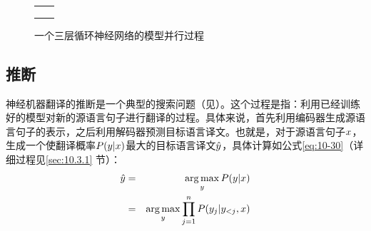 \begin{figure}[htp]
\centering
\begin{tabular}{l l}
\end{tabular}
\end{figure}
\begin{figure}[htp]
\centering
\begin{tabular}{l l}
\subfigure[]{} &\subfigure[]{} \\
\subfigure[]{}  &\subfigure[]{} \\
\subfigure[]{}  &\subfigure[]{}
\end{tabular}
\caption{一个三层循环神经网络的模型并行过程}
\label{fig:10-28}
\end{figure}

\subsection{推断}

\parinterval 神经机器翻译的推断是一个典型的搜索问题（见{\chaptertwo}）。这个过程是指：利用已经训练好的模型对新的源语言句子进行翻译的过程。具体来说，首先利用编码器生成源语言句子的表示，之后利用解码器预测目标语言译文。也就是，对于源语言句子${{x}}$，生成一个使翻译概率${P}({{y}} | {{x}})$最大的目标语言译文$\hat{{{y}}}$，具体计算如公式\eqref{eq:10-30}（详细过程见\ref{sec:10.3.1} 节）：
\begin{eqnarray}
\hat{{{y}}} & = & \operatorname*{arg\,max}_{{{y}}} {P}({{y}} | {{x}}) \nonumber \\
                 & = & \operatorname*{arg\,max}_{{{y}}} \prod_{j=1}^n {P}(y_j | {{y}}_{<j},{{x}})
\label{eq:10-30}
\end{eqnarray}

